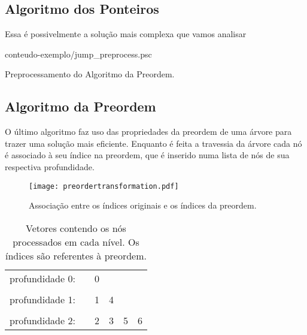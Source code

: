 \subsection{Algoritmo dos Ponteiros}
Essa é possivelmente a solução mais complexa que vamos analisar

\begin{program}[h!]
  
  {conteudo-exemplo/jump_preprocess.psc}

  \caption{Preprocessamento do Algoritmo da Preordem.\label{prog:preorderproc}}
\end{program}

\subsection{Algoritmo da Preordem}
O último algoritmo faz uso das propriedades da preordem de uma árvore para trazer uma
solução mais eficiente. Enquanto é feita a travessia da árvore cada nó é associado à
seu índice na preordem, que é inserido numa lista de nós de sua respectiva profundidade.

\begin{figure}
  \centering
  \texttt{[image: preordertransformation.pdf]}
  \caption{Associação entre os índices originais e os índices da preordem.}
\end{figure}

\begin{table}[]
  \begin{tabular}{llllll}
  \cline{3-3}
  profundidade 0: & \multicolumn{1}{l|}{} & \multicolumn{1}{l|}{0} &                        &                        &                        \\ \cline{3-3}
                  &                       &                        &                        &                        &                        \\ \cline{3-4}
  profundidade 1: & \multicolumn{1}{l|}{} & \multicolumn{1}{l|}{1} & \multicolumn{1}{l|}{4} &                        &                        \\ \cline{3-4}
                  &                       &                        &                        &                        &                        \\ \cline{3-6} 
  profundidade 2: & \multicolumn{1}{l|}{} & \multicolumn{1}{l|}{2} & \multicolumn{1}{l|}{3} & \multicolumn{1}{l|}{5} & \multicolumn{1}{l|}{6} \\ \cline{3-6} 
  \end{tabular}
  \caption[Vetores contendo os nós processados em cada nível.]
  {Vetores contendo os nós processados em cada nível. Os índices são referentes à preordem.}
\end{table}

